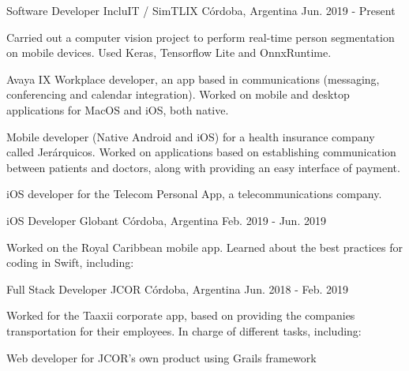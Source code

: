 \documentclass[11pt, a4paper]{resume}
\begin{document}
\begin{cventries}

  \cventry
    {Software Developer}
    {IncluIT / SimTLIX}
    {Córdoba, Argentina}
    {Jun. 2019 - Present}
    {
      \begin{cvitems}
        \item {Carried out a computer vision project to perform real-time person segmentation on mobile devices. Used Keras, Tensorflow Lite and OnnxRuntime.}
		\item {Avaya IX Workplace developer, an app based in communications (messaging, conferencing and calendar integration). Worked on mobile and desktop applications for MacOS and iOS, both native. }
		\item {Mobile developer (Native Android and iOS) for a health insurance company called Jerárquicos. Worked on applications based on establishing communication between patients and doctors, along with providing an easy interface of payment.}
		\item {iOS developer for the Telecom Personal App, a telecommunications company.}
      \end{cvitems}
    }

  \cventry
    {iOS Developer}
    {Globant}
    {Córdoba, Argentina}
    {Feb. 2019 - Jun. 2019}
    {
      \begin{cvitems}
        \item {Worked on the Royal Caribbean mobile app. Learned about the best practices for coding in Swift, including:}
      \end{cvitems}
    }

  \cventry
    {Full Stack Developer}
    {JCOR}
    {Córdoba, Argentina}
    {Jun. 2018 - Feb. 2019}
    {
      \begin{cvitems}
        \item {Worked for the Taaxii corporate app, based on providing the companies transportation for their employees. In charge of different tasks, including:}
		\item {Web developer for JCOR's own product using Grails framework}
      \end{cvitems}
    }


\end{cventries}
\end{document}
